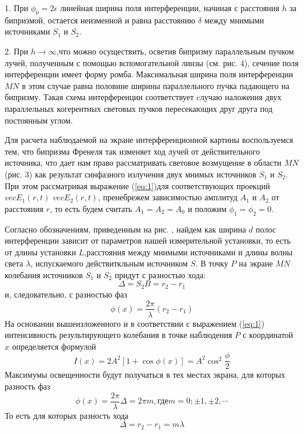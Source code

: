 1. При $\phi_0 = 2\epsilon$	линейная ширина поля интерференции,
начиная с расстояния $h$ за бипризмой, остается неизменной и равна расстоянию $\delta$ между мнимыми источниками $S_1$ и $S_2$.

2. При $h\rightarrow\infty$,что можно осуществить,
осветив бипризму параллельным пучком лучей, полученным с помощью вспомогательной линзы (см. рис. 4), сечение поля интерференции имеет форму ромба. Максимальная ширина поля интерференции $MN$ в этом случае равна половине ширины параллельного пучка падающего на бипризму. Такая схема интерференции соответствует cлучаю наложения двух параллельных когерентных световых пучков
пересекающих друг друга под постоянным углом.

Для расчета наблюдаемой на экране интерференционной картины воспользуемся тем, что бипризма Френеля так изменяет ход лучей от действительного источника, что дает нам право рассматривать световое возмущение в области $MN$ (рис. 3) как результат синфазного излучения двух мнимых источников $S_1$ и $S_2$. При этом рассматривая выражение (\ref{eq:1})для соответствующих проекций $vec{E_1}(r,t)$ $vec{E_2}(r,t)$, пренебрежем зависимостью амплитуд $A_1$ и $A_2$ от расстояния $r$, то есть будем считать $A_1=A_2=A_0$	и положим $\phi_1=\phi_2=0$.

Согласно обозначениям, приведенным на рис. , найдем как ширина $d$ полос интерференции зависит от параметров нашей измерительной установки, то есть от длины установки $L$,расстояния между мнимыми источниками и длины волны света  
$\lambda$, испускаемого действиткльным источником $S$. В точку $P$ на экране $MN$ колебания источников $S_1$ и $S_2$ придут с разностью хода:
\begin{equation}
	\Delta=S_2B=r_2-r_1
\end{equation}
и, следовательно, с разностью фаз
\begin{equation}
	\phi(x)=\frac{2\pi}{\lambda}(r_2-r_1)
\end{equation}
На основании вышеизложенного и в соответствии с выражением (\ref{eq:1}) интенсивность результирующего колебания в точке наблюдения $P$ с координатой $x$ определяется формулой
\begin{equation}
	I(x)=2A^2[1+\cos{\phi(x)}]=A^2\cos^2{\frac{\phi}{2}}
\end{equation}
Максимумы освещенности будут получаться в тех местах экрана, для которых разность фаз
\begin{equation}
	\phi(x)=\frac{2\pi}{\lambda}\Delta=2\pi m, \text{где} m=0;\pm 1,\pm 2,\cdots
\end{equation}
То есть для которых разность хода
\begin{equation}
	\Delta=r_2-r_1=m\lambda
\end{equation}

